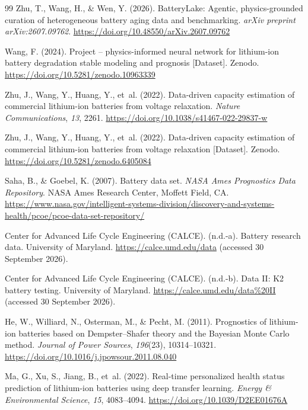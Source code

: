 \documentclass[preprint,12pt]{elsarticle}
\begin{document}
\begin{thebibliography}{99}
Zhu, T., Wang, H., \& Wen, Y. (2026). BatteryLake: Agentic, physics-grounded curation of heterogeneous battery aging data and benchmarking. \textit{arXiv preprint arXiv:2607.09762}. \url{https://doi.org/10.48550/arXiv.2607.09762}

Wang, F. (2024). Project -- physics-informed neural network for lithium-ion battery degradation stable modeling and prognosis [Dataset]. Zenodo. \url{https://doi.org/10.5281/zenodo.10963339}

Zhu, J., Wang, Y., Huang, Y., et~al. (2022). Data-driven capacity estimation of commercial lithium-ion batteries from voltage relaxation. \textit{Nature Communications}, \textit{13}, 2261. \url{https://doi.org/10.1038/s41467-022-29837-w}

Zhu, J., Wang, Y., Huang, Y., et~al. (2022). Data-driven capacity estimation of commercial lithium-ion batteries from voltage relaxation [Dataset]. Zenodo. \url{https://doi.org/10.5281/zenodo.6405084}

Saha, B., \& Goebel, K. (2007). Battery data set. \textit{NASA Ames Prognostics Data Repository}. NASA Ames Research Center, Moffett Field, CA. \url{https://www.nasa.gov/intelligent-systems-division/discovery-and-systems-health/pcoe/pcoe-data-set-repository/}

Center for Advanced Life Cycle Engineering (CALCE). (n.d.-a). Battery research data. University of Maryland. \url{https://calce.umd.edu/data} (accessed 30 September 2026).

Center for Advanced Life Cycle Engineering (CALCE). (n.d.-b). Data II: K2 battery testing. University of Maryland. \url{https://calce.umd.edu/data%20II} (accessed 30 September 2026).

He, W., Williard, N., Osterman, M., \& Pecht, M. (2011). Prognostics of lithium-ion batteries based on Dempster--Shafer theory and the Bayesian Monte Carlo method. \textit{Journal of Power Sources}, \textit{196}(23), 10314--10321. \url{https://doi.org/10.1016/j.jpowsour.2011.08.040}

Ma, G., Xu, S., Jiang, B., et~al. (2022). Real-time personalized health status prediction of lithium-ion batteries using deep transfer learning. \textit{Energy \& Environmental Science}, \textit{15}, 4083--4094. \url{https://doi.org/10.1039/D2EE01676A}


\end{thebibliography}
\end{document}
